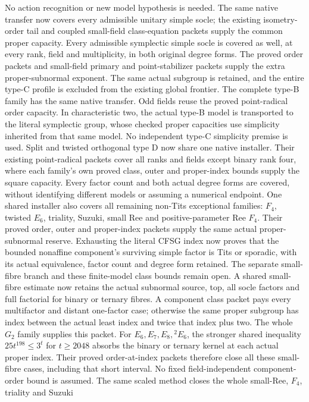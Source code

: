 No action recognition or new model hypothesis is needed. The same
native transfer now covers every admissible unitary simple socle;
the existing isometry-order tail and coupled small-field class-equation
packets supply the common proper capacity.
Every admissible symplectic simple socle is covered as well, at every
rank, field and multiplicity, in both original degree forms. The proved
order packets and small-field primary and point-stabilizer packets
supply the extra proper-subnormal exponent. The same actual subgroup
is retained, and the entire type-C profile is excluded from the
existing global frontier.
The complete type-B family has the same native transfer. Odd fields
reuse the proved point-radical order capacity. In characteristic two,
the actual type-B model is transported to the literal symplectic group,
whose checked proper capacities use simplicity inherited from that
same model. No independent type-C simplicity premise is used.
Split and twisted orthogonal type D now share one native installer.
Their existing point-radical packets cover all ranks and fields except
binary rank four, where each family's own proved class, outer and
proper-index bounds supply the square capacity. Every factor count and
both actual degree forms are covered, without identifying different
models or assuming a numerical endpoint.
One shared installer also covers all remaining non-Tits exceptional
families: $F_4$, twisted $E_6$, triality, Suzuki, small Ree and
positive-parameter Ree $F_4$. Their proved order, outer and proper-index
packets supply the same actual proper-subnormal reserve. Exhausting
the literal CFSG index now proves that the bounded nonaffine
component's surviving simple factor is Tits or sporadic, with its
actual equivalence, factor count and degree form retained. The
separate small-fibre branch and these finite-model class bounds remain
open.
A shared small-fibre estimate now retains the actual subnormal source,
top, all socle factors and full factorial for binary or ternary fibres.
A component class packet pays every multifactor and distant one-factor
case; otherwise the same proper subgroup has index between the actual
least index and twice that index plus two. The whole $G_2$ family
supplies this packet. For $E_6,E_7,E_8,{}^2E_6$, the stronger shared
inequality $25t^{198}\leq3^t$ for $t\geq2048$ absorbs the binary or
ternary kernel at each actual proper index. Their proved order-at-index
packets therefore close all these small-fibre cases, including that
short interval. No fixed field-independent component-order bound is
assumed.
The same scaled method closes the whole small-Ree, $F_4$, triality and Suzuki
